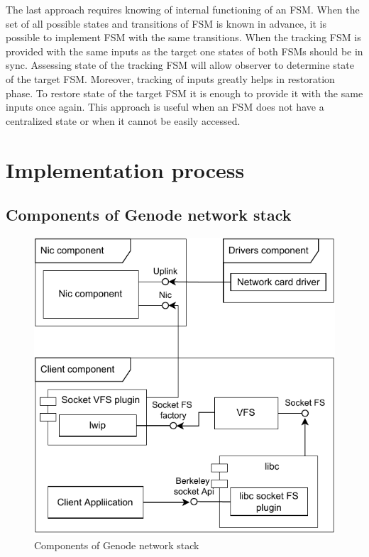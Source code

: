 The last approach requires knowing of internal functioning of an FSM. When the
set of all possible states and transitions of FSM is known in advance, it is
possible to implement FSM with the same transitions. When the tracking FSM is
provided with the same inputs as the target one states of both FSMs should be
in sync. Assessing state of the tracking FSM will allow observer to determine
state of the target FSM.  Moreover, tracking of inputs greatly helps in
restoration phase. To restore state of the target FSM it is enough to provide
it with the same inputs once again. This approach is useful when an FSM does
not have a centralized state or when it cannot be easily accessed.

\section{Implementation process}

\subsection{Components of Genode network stack}

\begin{figure}
    \centering
    \includegraphics[]{figs/genode-network-stack.pdf}
    \caption{Components of Genode network stack}
    \label{fig:net-components}
\end{figure}

